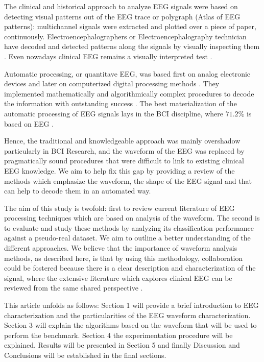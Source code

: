 \documentclass[sensors,article,submit,moreauthors,pdftex,10pt,a4paper]{mdpi}
\begin{document}
The clinical and historical approach to analyze EEG signals were based on detecting visual patterns out of the EEG trace or polygraph (Atlas of EEG patterns): multichannel signals were extracted and plotted over a piece of paper, continuously. Electroencephalographers or Electroencephalography technician have decoded and detected patterns along the signals by visually inspecting them \citep{Schomer2010}.  Even nowadays clinical EEG remains a visually interpreted test \citep{Hartman2005}.

Automatic processing, or quantitave EEG, was based first on analog electronic devices and later on computerized digital processing methods \citep{Jansen1991}.  They implemented mathematically and algorithmically complex procedures to decode the information with outstanding success \citep{Yuste2017}.  The best materialization of the automatic processing of EEG signals lays in the BCI discipline, where $71.2\%$ is based on EEG \citep{Guger2017}.  


Hence, the traditional and knowledgeable approach was mainly overshadow particularly in BCI Research, and the waveform of the EEG was replaced by pragmatically sound procedures that were difficult to link to existing clinical EEG knowledge.  We aim to help fix this gap by providing a review of the methods which emphasize the waveform, the shape of the EEG signal and that can help to decode them in an automated way.

The aim of this study is twofold: first to review current literature of EEG processing techniques which are based on analysis of the waveform.  The second is to evaluate and study these methods by analyzing its classification performance against a pseudo-real dataset. We aim to outline a better understanding of the different approaches.  We believe that the importance of waveform analysis methods, as described here, is that by using this methodology, collaboration could be fostered because there is a clear description and characterization of the signal, where the extensive literature which explores clinical EEG can be reviewed from the same shared perspective \citep{Nijboer2009,Wei2017}. 

This article unfolds as follows: Section 1 will provide a brief introduction to EEG characterization and the particularities of the EEG waveform characterization.  Section 3 will explain the algorithms based on the waveform that will be used to perform the benchmark.  Section 4 the experimentation procedure will be explained.  Results will be presented in Section 5 and finally Discussion and Conclusions will be established in the final sections.
\end{document}
